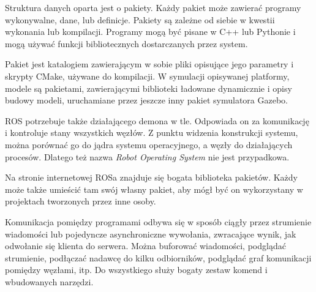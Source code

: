 	Struktura danych oparta jest o pakiety. Każdy pakiet może zawierać programy wykonywalne, dane, lub definicje. Pakiety są zależne od siebie w kwestii wykonania lub kompilacji.
	Programy mogą być pisane w C++ lub Pythonie i mogą używać funkcji bibliotecznych dostarczanych przez system.
	
	Pakiet jest katalogiem zawierającym w sobie pliki opisujące jego parametry i skrypty CMake, używane do kompilacji.
	W symulacji opisywanej platformy, modele są pakietami, zawierającymi biblioteki ładowane dynamicznie i opisy budowy modeli, uruchamiane przez jeszcze inny pakiet symulatora Gazebo.
	
	ROS potrzebuje także działającego demona w tle. Odpowiada on za komunikację i kontroluje stany wszystkich węzłów.
	Z punktu widzenia konstrukcji systemu, można porównać go do jądra systemu operacyjnego, a węzły do działających procesów.
	Dlatego też nazwa \emph{Robot Operating System} nie jest przypadkowa.
		
	Na stronie internetowej ROSa znajduje się bogata biblioteka pakietów.
	Każdy może także umieścić tam swój własny pakiet, aby mógł być on wykorzystany w projektach tworzonych przez inne osoby.

	Komunikacja pomiędzy programami odbywa się w sposób ciągły przez strumienie wiadomości lub pojedyncze asynchroniczne wywołania, zwracające wynik, jak odwołanie się klienta do serwera.
	Można buforować wiadomości, podglądać strumienie, podłączać nadawcę do kilku odbiorników, podglądać graf komunikacji pomiędzy węzłami, itp.
	Do wszystkiego służy bogaty zestaw komend i wbudowanych narzędzi.
	
